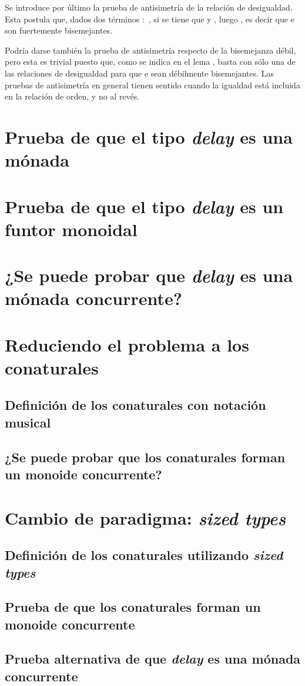 Se introduce por último la prueba de antisimetría de la relación de desigualdad. Esta postula que, dados dos términos  $:$  \AgdaDatatype{$\bot$}, si se tiene que  \AgdaFunction{$\gtrsim$}  y  \AgdaFunction{$\lesssim$} , luego  \AgdaFunction{$\cong$} , es decir que  e  son fuertemente bisemejantes.


Podría darse también la prueba de antisimetría respecto de la bisemejanza débil, pero esta es trivial puesto que, como se indica en el lema \AgdaFunction{$\gtrsim\Rightarrow$}, basta con sólo una de las relaciones de desigualdad para que  e  sean débilmente bisemejantes. Las pruebas de antisimetría en general tienen sentido cuando la igualdad está incluida en la relación de orden, y no al revés.


\section{Prueba de que el tipo \textit{delay} es una mónada}

\section{Prueba de que el tipo \textit{delay} es un funtor monoidal}

\section{¿Se puede probar que \textit{delay} es una mónada concurrente?}

\section{Reduciendo el problema a los conaturales}

\subsection{Definición de los conaturales con notación musical}

\subsection{¿Se puede probar que los conaturales forman un monoide concurrente?}

\section{Cambio de paradigma: \textit{sized types}}

\subsection{Definición de los conaturales utilizando \textit{sized types}}

\subsection{Prueba de que los conaturales forman un monoide concurrente}

\subsection{Prueba alternativa de que \textit{delay} es una mónada concurrente}